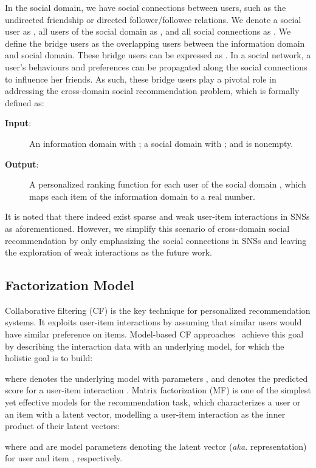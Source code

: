 \documentclass[sigconf]{acmart}
\newcommand{\aka}{\emph{aka. }}
\begin{document}
In the social domain, we have social connections between users, such as the undirected friendship or directed follower/followee relations.
We denote a social user as , all users of the social domain as , and all social connections as .
We define the bridge users as the overlapping users between the information domain and social domain. These bridge users can be expressed as .
In a social network, a user's behaviours and preferences can be propagated along the social connections to influence her friends. As such, these bridge users play a pivotal role in addressing the cross-domain social recommendation problem, which is formally defined as:
\begin{description}
	\item[\textbf{Input}:] An information domain with ; a social domain with ; and  is nonempty.
	\item[\textbf{Output}:] A personalized ranking function for each user  of the social domain , which maps each item of the information domain to a real number.
\end{description}
It is noted that there indeed exist sparse and weak user-item interactions in SNSs as aforementioned. However, we simplify this scenario of cross-domain social recommendation by only emphasizing the social connections in SNSs and leaving the exploration of weak interactions as the future work.






\subsection{Factorization Model}
Collaborative filtering (CF) is the key technique for personalized recommendation systems. It exploits user-item interactions by assuming that similar users would have similar preference on items.
Model-based CF approaches~\cite{iCD,DCF} achieve this goal by describing the interaction data with an underlying model, for which the holistic goal is to build:

where  denotes the underlying model with parameters , and  denotes the predicted score for a user-item interaction .
Matrix factorization (MF) is one of the simplest yet effective models for the recommendation task, which characterizes a user or an item with a latent vector, modelling a user-item interaction as the inner product of their latent vectors:

where  and  are model parameters denoting the latent vector (\aka representation) for user  and item , respectively.
\end{document}
